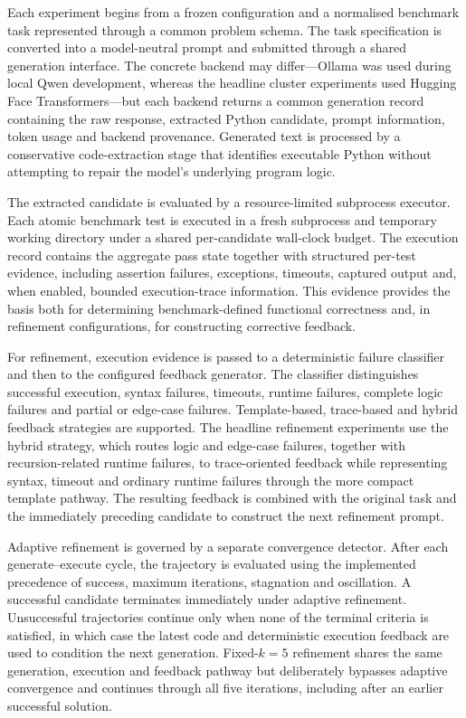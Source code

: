 Each experiment begins from a frozen configuration and a normalised benchmark task represented through a common problem schema. The task specification is converted into a model-neutral prompt and submitted through a shared generation interface. The concrete backend may differ---Ollama was used during local Qwen development, whereas the headline cluster experiments used Hugging Face Transformers---but each backend returns a common generation record containing the raw response, extracted Python candidate, prompt information, token usage and backend provenance. Generated text is processed by a conservative code-extraction stage that identifies executable Python without attempting to repair the model's underlying program logic.

The extracted candidate is evaluated by a resource-limited subprocess executor. Each atomic benchmark test is executed in a fresh subprocess and temporary working directory under a shared per-candidate wall-clock budget. The execution record contains the aggregate pass state together with structured per-test evidence, including assertion failures, exceptions, timeouts, captured output and, when enabled, bounded execution-trace information. This evidence provides the basis both for determining benchmark-defined functional correctness and, in refinement configurations, for constructing corrective feedback.

For refinement, execution evidence is passed to a deterministic failure classifier and then to the configured feedback generator. The classifier distinguishes successful execution, syntax failures, timeouts, runtime failures, complete logic failures and partial or edge-case failures. Template-based, trace-based and hybrid feedback strategies are supported. The headline refinement experiments use the hybrid strategy, which routes logic and edge-case failures, together with recursion-related runtime failures, to trace-oriented feedback while representing syntax, timeout and ordinary runtime failures through the more compact template pathway. The resulting feedback is combined with the original task and the immediately preceding candidate to construct the next refinement prompt.

Adaptive refinement is governed by a separate convergence detector. After each generate--execute cycle, the trajectory is evaluated using the implemented precedence of success, maximum iterations, stagnation and oscillation. A successful candidate terminates immediately under adaptive refinement. Unsuccessful trajectories continue only when none of the terminal criteria is satisfied, in which case the latest code and deterministic execution feedback are used to condition the next generation. Fixed-$k=5$ refinement shares the same generation, execution and feedback pathway but deliberately bypasses adaptive convergence and continues through all five iterations, including after an earlier successful solution.

